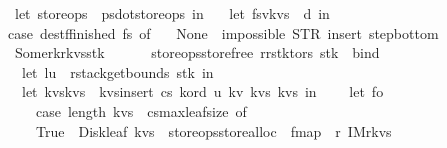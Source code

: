 \begin{isabellebody}
\ \ {\isacharparenleft}{\isacharasterisk}\ let\ store{\isacharunderscore}ops\ {\isacharequal}\ ps{}{\isacharbar}{\isachargreater}dot{\isacharunderscore}store{\isacharunderscore}ops\ in\ {\isacharasterisk}{\isacharparenright}\isanewline
\ \ let\ {\isacharparenleft}fs{\isacharcomma}{\isacharparenleft}v{\isacharcomma}kvs{}{\isacharparenright}{\isacharparenright}\ {\isacharequal}\ d\ in\isanewline
\ \ case\ dest{\isacharunderscore}f{\isacharunderscore}finished\ fs\ of\ \isanewline
\ \ None\ {\isasymRightarrow}\ impossible{}\ {\isacharparenleft}STR\ {\isacharprime}{\isacharprime}insert{\isacharcomma}\ step{\isacharunderscore}bottom{\isacharprime}{\isacharprime}{\isacharparenright}\isanewline
\ \ {\isacharbar}\ Some{\isacharparenleft}r{}{\isacharcomma}k{\isacharcomma}r{\isacharcomma}kvs{\isacharcomma}stk{\isacharparenright}\ {\isasymRightarrow}\ {\isacharparenleft}\isanewline
\ \ \ \ {\isacharparenleft}store{\isacharunderscore}ops{\isacharbar}{\isachargreater}store{\isacharunderscore}free{\isacharparenright}\ {\isacharparenleft}r{}{\isacharhash}{\isacharparenleft}r{\isacharunderscore}stk{\isacharunderscore}to{\isacharunderscore}rs\ stk{\isacharparenright}{\isacharparenright}\ {\isacharbar}{\isachargreater}\ bind\ \isanewline
\ \ \ \ {\isacharparenleft}{\isacharpercent}\ {\isacharunderscore}{\isachardot}\isanewline
\ \ \ \ let\ {\isacharparenleft}l{\isacharcomma}u{\isacharparenright}\ {\isacharequal}\ rstack{\isacharunderscore}get{\isacharunderscore}bounds\ stk\ in\isanewline
\ \ \ \ let\ {\isacharparenleft}kvs{\isacharprime}{\isacharcomma}kvs{}{\isacharprime}{\isacharparenright}\ {\isacharequal}\ kvs{\isacharunderscore}insert{\isacharunderscore}{}\ cs\ k{\isacharunderscore}ord\ u\ {\isacharparenleft}k{\isacharcomma}v{\isacharparenright}\ kvs{}\ kvs\ in\isanewline
\ \ \ \ let\ fo\ {\isacharequal}\ {\isacharparenleft}\isanewline
\ \ \ \ \ \ case\ {\isacharparenleft}length\ kvs{\isacharprime}\ {\isasymle}\ cs{\isacharbar}{\isachargreater}max{\isacharunderscore}leaf{\isacharunderscore}size{\isacharparenright}\ of\isanewline
\ \ \ \ \ \ True\ {\isasymRightarrow}\ {\isacharparenleft}Disk{\isacharunderscore}leaf\ kvs{\isacharprime}\ {\isacharbar}{\isachargreater}\ {\isacharparenleft}store{\isacharunderscore}ops{\isacharbar}{\isachargreater}store{\isacharunderscore}alloc{\isacharparenright}\ {\isacharbar}{\isachargreater}\ fmap\ {\isacharparenleft}{\isacharpercent}\ r{\isacharprime}{\isachardot}\ IM{}{\isacharparenleft}r{\isacharprime}{\isacharcomma}kvs{}{\isacharprime}{\isacharparenright}{\isacharparenright}{\isacharparenright}\isanewline

\end{isabellebody}
